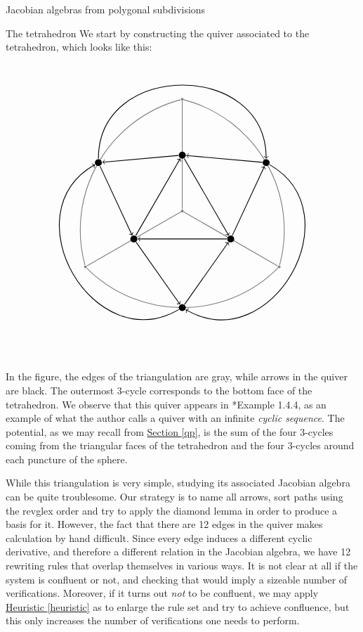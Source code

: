 \begin{chapter}{Jacobian algebras from polygonal subdivisions}
\begin{section}{The tetrahedron}
\label{tetra}
We start by constructing the quiver associated to the tetrahedron, which looks like this:
\[
\begin{tikzpicture}[thick]
\tikzstyle{every node} = [circle, fill=gray, minimum size=.1cm, inner sep=0cm]
\node (c) at (0,0) {};
\node (n) at (0,4) {};
\node (sw) at (210:4) {};
\node (se) at (330:4) {};
\draw[gray] (c) -- (sw)
	(c) -- (n)
	(c) -- (se)
	(sw) to [bend right = 45] coordinate[midway](m1) (se)
	(n) to [bend right = 45] coordinate[midway](m2) (sw)
	(se) to [bend right = 45] coordinate[midway](m3) (n);
\tikzstyle{every node} = [circle, fill=black, minimum size=.25cm, inner sep=0cm]
\node (in) at (0,2) {};
\node (isw) at (210:2) {};
\node (ise) at (330:2) {};
\node (os) at (m1) {};
\node (onw) at (m2) {};
\node (one) at (m3) {};
\draw[->] (in) -- (onw);
\draw[->] (onw) -- (isw);
\draw[->] (isw) -- (in);
\draw[->] (in) -- (ise);
\draw[->] (ise) -- (isw);
\draw[->] (ise) -- (one);
\draw[->] (one) -- (in);
\draw[->] (isw) -- (os);
\draw[->] (os) -- (ise);
\draw[->] (one) to [bend left=90, distance=100] (os);
\draw[->] (onw) to [bend left=90, distance=100] (one);
\draw[->] (os) to [bend left=90, distance=100] (onw);
\end{tikzpicture}
\]
In the figure, the edges of the triangulation are gray, while arrows in the quiver are black. The outermost 3-cycle corresponds to the bottom face of the tetrahedron. We observe that this quiver appears in {\cite{VD14}*{Example 1.4.4}}, as an example of what the author calls a quiver with an infinite \emph{cyclic sequence}. The potential, as we may recall from \hyperref[qp]{Section \ref*{qp}}, is the sum of the four 3-cycles coming from the triangular faces of the tetrahedron and the four 3-cycles around each puncture of the sphere.

While this triangulation is very simple, studying its associated Jacobian algebra can be quite troublesome. Our strategy is to name all arrows, sort paths using the revglex order and try to apply the diamond lemma in order to produce a basis for it. However, the fact that there are 12 edges in the quiver makes calculation by hand difficult. Since every edge induces a different cyclic derivative, and therefore a different relation in the Jacobian algebra, we have 12 rewriting rules that overlap themselves in various ways. It is not clear at all if the system is confluent or not, and checking that would imply a sizeable number of verifications. Moreover, if it turns out \emph{not} to be confluent, we may apply \hyperref[heuristic]{Heuristic \ref*{heuristic}} as to enlarge the rule set and try to achieve confluence, but this only increases the number of verifications one needs to perform.


\end{section}
\end{chapter}
